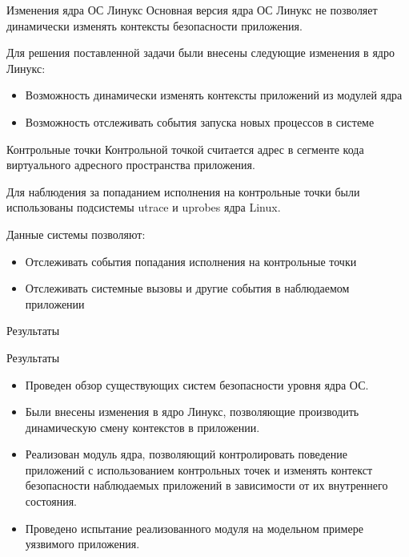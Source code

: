 \documentclass{beamer}
\begin{document}
\begin{frame}{Изменения ядра ОС Линукс}
Основная версия ядра ОС Линукс не позволяет динамически
изменять контексты безопасности приложения.

Для решения поставленной задачи были внесены следующие
изменения в ядро Линукс:

\begin{itemize}
\item Возможность динамически изменять контексты приложений
        из модулей ядра
\item Возможность отслеживать события запуска новых процессов
        в системе
\end{itemize}
\end{frame}
 


 

\begin{frame}[fragile]{Контрольные точки}
Контрольной точкой считается адрес в сегменте кода
виртуального адресного пространства приложения.

Для наблюдения за попаданием исполнения на контрольные
точки были использованы подсистемы utrace и uprobes
ядра Linux.

Данные системы позволяют:
\begin{itemize}
\item Отслеживать события попадания исполнения на контрольные точки
\item Отслеживать системные вызовы и другие события в наблюдаемом приложении
\end{itemize}

\end{frame}

\begin{frame}{Результаты}
\begin{block}{Результаты}
\begin{itemize}
\item Проведен обзор существующих систем безопасности уровня ядра ОС.
\item Были внесены изменения в ядро Линукс, позволяющие производить
        динамическую смену контекстов в приложении.
\item Реализован модуль ядра, позволяющий контролировать поведение
        приложений с использованием контрольных точек и изменять
        контекст безопасности наблюдаемых приложений в зависимости от
        их внутреннего состояния.

\item Проведено испытание реализованного модуля на модельном примере
        уязвимого приложения.
\end{itemize}
\end{block}
\end{frame}
\end{document}
